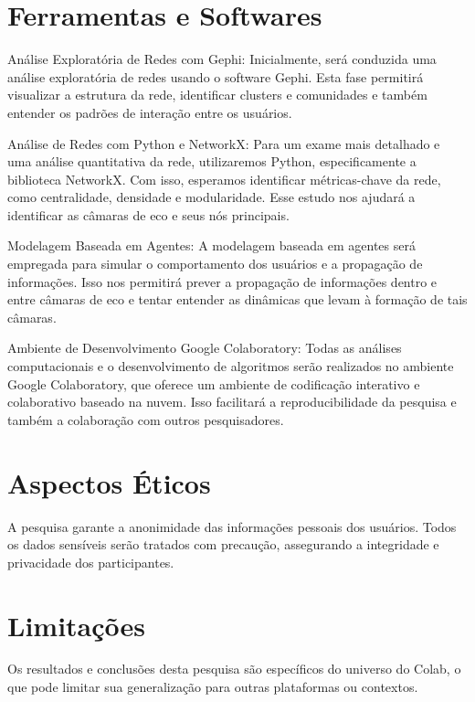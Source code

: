 \section{Ferramentas e Softwares}

Análise Exploratória de Redes com Gephi: Inicialmente, será conduzida uma análise exploratória de redes usando o software Gephi. Esta fase permitirá visualizar a estrutura da rede, identificar clusters e comunidades e também entender os padrões de interação entre os usuários.

Análise de Redes com Python e NetworkX: Para um exame mais detalhado e uma análise quantitativa da rede, utilizaremos Python, especificamente a biblioteca NetworkX. Com isso, esperamos identificar métricas-chave da rede, como centralidade, densidade e modularidade. Esse estudo nos ajudará a identificar as câmaras de eco e seus nós principais.

Modelagem Baseada em Agentes: A modelagem baseada em agentes será empregada para simular o comportamento dos usuários e a propagação de informações. Isso nos permitirá prever a propagação de informações dentro e entre câmaras de eco e tentar entender as dinâmicas que levam à formação de tais câmaras.

Ambiente de Desenvolvimento Google Colaboratory: Todas as análises computacionais e o desenvolvimento de algoritmos serão realizados no ambiente Google Colaboratory, que oferece um ambiente de codificação interativo e colaborativo baseado na nuvem. Isso facilitará a reproducibilidade da pesquisa e também a colaboração com outros pesquisadores.

\section{Aspectos Éticos}
A pesquisa garante a anonimidade das informações pessoais dos usuários. Todos os dados sensíveis serão tratados com precaução, assegurando a integridade e privacidade dos participantes.

\section{Limitações}
Os resultados e conclusões desta pesquisa são específicos do universo do Colab, o que pode limitar sua generalização para outras plataformas ou contextos.